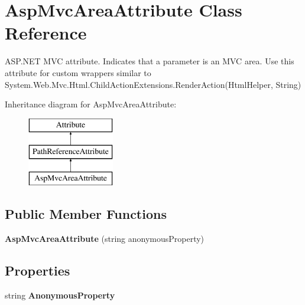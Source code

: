 \hypertarget{class_asp_mvc_area_attribute}{}\section{Asp\+Mvc\+Area\+Attribute Class Reference}
\label{class_asp_mvc_area_attribute}


A\+S\+P.\+N\+E\+T M\+V\+C attribute. Indicates that a parameter is an M\+V\+C area. Use this attribute for custom wrappers similar to {\ttfamily System.\+Web.\+Mvc.\+Html.\+Child\+Action\+Extensions.\+Render\+Action(\+Html\+Helper, String)}  


Inheritance diagram for Asp\+Mvc\+Area\+Attribute\+:\begin{figure}[H]
\begin{center}
\leavevmode
\includegraphics[height=3.000000cm]{class_asp_mvc_area_attribute}
\end{center}
\end{figure}
\subsection*{Public Member Functions}
\begin{DoxyCompactItemize}
\item 
\hypertarget{class_asp_mvc_area_attribute_ab0b90abe9b82844d54dd498623e0674e}{}{\bfseries Asp\+Mvc\+Area\+Attribute} (string anonymous\+Property)\label{class_asp_mvc_area_attribute_ab0b90abe9b82844d54dd498623e0674e}

\end{DoxyCompactItemize}
\subsection*{Properties}
\begin{DoxyCompactItemize}
\item 
\hypertarget{class_asp_mvc_area_attribute_a035e4e50658d154dfa22d68a08425a6b}{}string {\bfseries Anonymous\+Property}\label{class_asp_mvc_area_attribute_a035e4e50658d154dfa22d68a08425a6b}

\end{DoxyCompactItemize}


